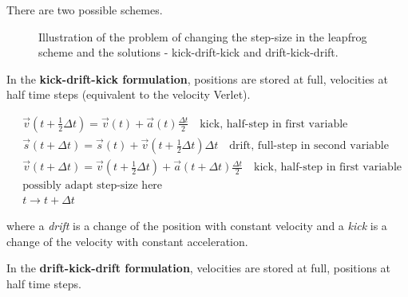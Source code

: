 
There are two possible schemes.

\begin{figure}[!htb]
  \centering
  \hfill
  \caption{Illustration of the problem of changing the step-size in the leapfrog scheme and the solutions - kick-drift-kick and drift-kick-drift.}
  \label{fig:leapfrog_adaptive_problem}
\end{figure}

In the \textbf{kick-drift-kick formulation}, positions are stored at full, velocities at half time steps (equivalent to the velocity Verlet).

\begin{equation}
\begin{aligned}
& \vec{v}(t + \frac{1}{2} \Delta t)=\vec{v}(t)+ \vec{a}(t) \frac{\Delta t}{2}  \quad \text {kick, half-step in first variable}\\
& \vec{s}(t + \Delta t)=\vec{s}(t)+ \vec{v}(t + \frac{1}{2} \Delta t) \Delta t  \quad \text {drift, full-step in second variable}\\
& \vec{v}(t + \Delta t)=\vec{v}(t + \frac{1}{2} \Delta t)+ \vec{a}(t + \Delta t) \frac{\Delta t}{2}  \quad \text {kick, half-step in first variable}\\
& \text{possibly adapt step-size here}\\
& t \rightarrow t + \Delta t
\end{aligned}
\end{equation}

where a \textit{drift} is a change of the position with constant velocity and a \textit{kick} is a change of the velocity with constant acceleration.

In the \textbf{drift-kick-drift formulation}, velocities are stored at full, positions at half time steps.

